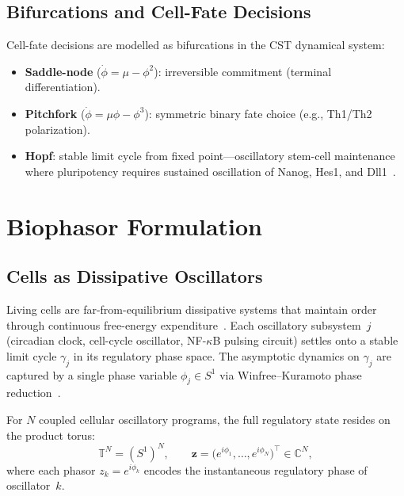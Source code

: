 \documentclass[preprint,12pt,amsmath,amssymb,superscriptaddress,floatfix]{revtex4-2}
\newcommand{\complex}{\mathbb{C}}
\newcommand{\torus}{\mathbb{T}}
\begin{document}
\subsection{Bifurcations and Cell-Fate Decisions}
\label{subsec:bifurcations}

Cell-fate decisions are modelled as bifurcations in the CST dynamical
system:
\begin{itemize}
    \item \textbf{Saddle-node} ($\dot\phi = \mu - \phi^2$): irreversible
    commitment (terminal differentiation).
    \item \textbf{Pitchfork} ($\dot\phi = \mu\phi - \phi^3$): symmetric
    binary fate choice (e.g., Th1/Th2 polarization).
    \item \textbf{Hopf}: stable limit cycle from fixed point---oscillatory
    stem-cell maintenance where pluripotency requires sustained
    oscillation of Nanog, Hes1, and Dll1~\cite{ref_imayoshi2013}.
\end{itemize}

\section{Biophasor Formulation}
\label{sec:formulation}

\subsection{Cells as Dissipative Oscillators}

Living cells are far-from-equilibrium dissipative systems that maintain
order through continuous free-energy expenditure~\cite{ref_prigogine1977}.
Each oscillatory subsystem~$j$ (circadian clock, cell-cycle oscillator,
NF-$\kappa$B pulsing circuit) settles onto a stable limit cycle
$\gamma_j$ in its regulatory phase space.  The asymptotic dynamics on
$\gamma_j$ are captured by a single phase variable $\phi_j \in S^1$
via Winfree--Kuramoto phase reduction~\cite{ref_kuramoto1984,ref_winfree1980}.

For $N$ coupled cellular oscillatory programs, the full regulatory
state resides on the product torus:
\begin{equation}
    \torus^N = (S^1)^N, \qquad
    \boldsymbol{z} = \bigl(e^{i\phi_1}, \ldots, e^{i\phi_N}\bigr)^\top
    \in \complex^N,
    \label{eq:cell_torus}
\end{equation}
where each phasor $z_k = e^{i\phi_k}$ encodes the instantaneous
regulatory phase of oscillator~$k$.
\end{document}
